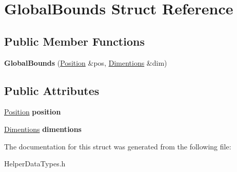 \hypertarget{struct_global_bounds}{}\section{Global\+Bounds Struct Reference}
\label{struct_global_bounds}
\subsection*{Public Member Functions}
\begin{DoxyCompactItemize}
\item 
\mbox{\label{struct_global_bounds_a38d87fc7f3c34bff62bd744ac9fc3724}} 
{\bfseries Global\+Bounds} (\hyperlink{struct_position}{Position} \&pos, \hyperlink{struct_dimentions}{Dimentions} \&dim)
\end{DoxyCompactItemize}
\subsection*{Public Attributes}
\begin{DoxyCompactItemize}
\item 
\mbox{\label{struct_global_bounds_a6224bede2eff12cec85b6999b7faedc3}} 
\hyperlink{struct_position}{Position} {\bfseries position}
\item 
\mbox{\label{struct_global_bounds_a1fb273eb005424a1d6ff34d3808c7081}} 
\hyperlink{struct_dimentions}{Dimentions} {\bfseries dimentions}
\end{DoxyCompactItemize}


The documentation for this struct was generated from the following file\+:\begin{DoxyCompactItemize}
\item 
Helper\+Data\+Types.\+h\end{DoxyCompactItemize}
